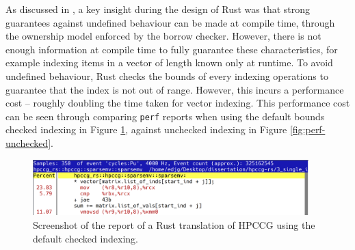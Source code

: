 As discussed in , a key insight during the design of Rust was that strong guarantees against undefined behaviour can be made at compile time, through the ownership model enforced by the borrow checker. However, there is not enough information at compile time to fully guarantee these characteristics, for example indexing items in a vector of length known only at runtime. To avoid undefined behaviour, Rust checks the bounds of every indexing operations to guarantee that the index is not out of range. However, this incurs a performance cost -- roughly doubling the time taken for vector indexing. This performance cost can be seen through comparing \texttt{perf} reports when using the default bounds checked indexing in Figure \ref{fig:perf-checked}, against unchecked indexing in Figure \ref{fig:perf-unchecked}.

\begin{figure}[H]
    \centering
    \includegraphics[width=0.95\textwidth]{images/5_performance/perf/perf_checked_op.png}
    \caption{Screenshot of the  report of a Rust translation of HPCCG using the default checked indexing.}
    \label{fig:perf-checked}
\end{figure}

